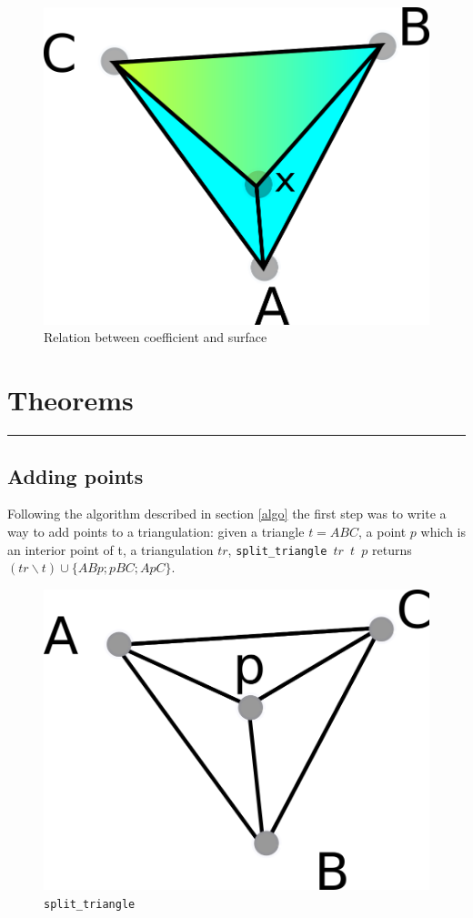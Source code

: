 \documentclass[a4paper,10pt]{article}
\begin{document}
\begin{figure}
  \centering

  \includegraphics[scale=2]{cara.png}

  \caption{\label{cara} Relation between coefficient and surface}
\end{figure}


\section{Theorems}
\rule{\linewidth}{0.5pt}
\subsection{Adding points}
\label{theorem1}
Following the algorithm described in section \ref{algo} the first step was to write a way to add points to a triangulation: given a triangle $t = ABC$, a point $p$ which is an interior point of t, a triangulation $tr$, {\tt split\_triangle $tr$ $t$ $p$} returns $(tr \smallsetminus t) \cup \{ABp;pBC;ApC\}$.
\begin{figure}
  \centering
  \includegraphics[scale=2]{split_triangle}
    \caption{\label{split_triangle} {\tt split\_triangle}}
\end{figure}
\end{document}
